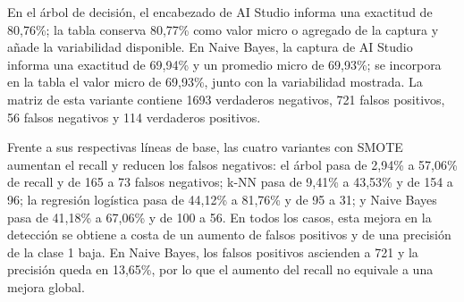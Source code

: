 \documentclass[12pt,a4paper]{article}
\begin{document}
\begin{table}[H]
\centering
\caption{Comparación de las cuatro variantes verificadas con SMOTE.}
\label{tab:smote-variants-comparison}
\small
{}
\end{table}

En el árbol de decisión, el encabezado de AI Studio informa una exactitud de 80,76\%; la tabla conserva 80,77\% como valor micro o agregado de la captura y añade la variabilidad disponible. En Naive Bayes, la captura de AI Studio informa una exactitud de 69,94\% y un promedio micro de 69,93\%; se incorpora en la tabla el valor micro de 69,93\%, junto con la variabilidad mostrada. La matriz de esta variante contiene 1693 verdaderos negativos, 721 falsos positivos, 56 falsos negativos y 114 verdaderos positivos.

Frente a sus respectivas líneas de base, las cuatro variantes con SMOTE aumentan el recall y reducen los falsos negativos: el árbol pasa de 2,94\% a 57,06\% de recall y de 165 a 73 falsos negativos; k-NN pasa de 9,41\% a 43,53\% y de 154 a 96; la regresión logística pasa de 44,12\% a 81,76\% y de 95 a 31; y Naive Bayes pasa de 41,18\% a 67,06\% y de 100 a 56. En todos los casos, esta mejora en la detección se obtiene a costa de un aumento de falsos positivos y de una precisión de la clase 1 baja. En Naive Bayes, los falsos positivos ascienden a 721 y la precisión queda en 13,65\%, por lo que el aumento del recall no equivale a una mejora global.
\end{document}
